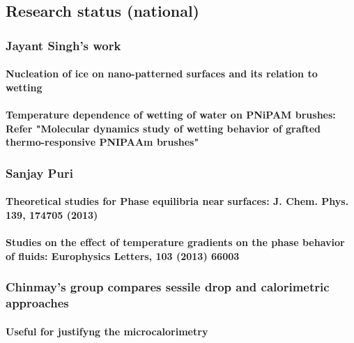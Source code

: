 \documentclass[a4paper,12pt,single,pdftex]{scrartcl}
\begin{document}
{\label{ID_374576713}\subsection{Research status (national)}

\label{ID_1169605654}\subsubsection{Jayant Singh's work}

\label{ID_1127102184}\paragraph{Nucleation of ice on nano-patterned surfaces and its relation to wetting}

\label{ID_21321814}\paragraph{Temperature dependence of wetting of water on PNiPAM brushes: Refer "Molecular dynamics study of wetting behavior of grafted thermo-responsive PNIPAAm brushes"}

\label{ID_154250283}\subsubsection{Sanjay Puri}

\label{ID_920584188}\paragraph{Theoretical studies for Phase equilibria near surfaces: J. Chem. Phys. 139, 174705 (2013)}

\label{ID_595749615}\paragraph{Studies on the effect of temperature gradients on the phase behavior of fluids: Europhysics Letters, 103 (2013) 66003}

\label{ID_135785427}\subsubsection{Chinmay's group compares sessile drop and calorimetric approaches}

\label{ID_1532965186}\paragraph{Useful for justifyng the microcalorimetry}

}
\end{document}
